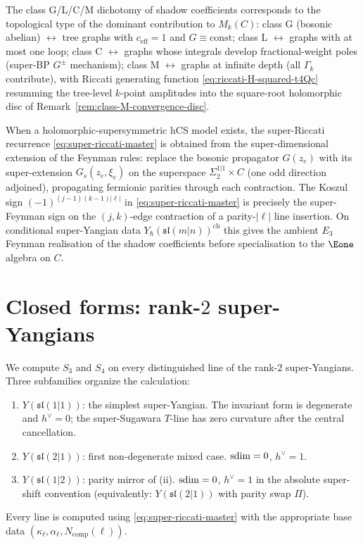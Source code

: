 \begin{remark}
\label{rem:shadow-class-geometric-Gamma-k}
The class G/L/C/M dichotomy of shadow coefficients corresponds to the
topological type of the dominant contribution to $M_k(C)$: class G
(bosonic abelian) $\leftrightarrow$ tree graphs with
$c_{\mathrm{eff}} = 1$ and $G \equiv \mathrm{const}$; class L
$\leftrightarrow$ graphs with at most one loop; class C
$\leftrightarrow$ graphs whose integrals develop fractional-weight
poles (super-BP $G^\pm$ mechanism); class M $\leftrightarrow$ graphs
at infinite depth (all $\Gamma_k$ contribute), with Riccati
generating function \eqref{eq:riccati-H-squared-t4Qc} resumming the
tree-level $k$-point amplitudes into the square-root holomorphic
disc of Remark~\ref{rem:class-M-convergence-disc}.
\end{remark}

\begin{remark}
\label{rem:super-feynman-fermionic-extension}
When a holomorphic-supersymmetric hCS model exists, the super-Riccati
recurrence \eqref{eq:super-riccati-master} is obtained from the
super-dimensional extension of the Feynman rules: replace the bosonic
propagator $G(z_e)$ with its super-extension $G_s(z_e,
\xi_e)$ on the superspace $\Sigma_2^{1|1} \times C$ (one odd
direction adjoined), propagating fermionic parities through each
contraction. The Koszul sign $(-1)^{(j-1)(k-1) |\ell|}$ in
\eqref{eq:super-riccati-master} is precisely the super-Feynman sign
on the $(j, k)$-edge contraction of a parity-$|\ell|$ line insertion.
On conditional super-Yangian data
$Y_\hbar(\mathfrak{sl}(m|n))^{\mathrm{ch}}$ this gives the ambient
$E_3$ Feynman realisation of the shadow coefficients before
specialisation to the $\Eone$ algebra on $C$.
\end{remark}

\section{Closed forms: rank-\texorpdfstring{$2$}{2} super-Yangians}
\label{sec:super-riccati-closed-forms}

We compute $S_3$ and $S_4$ on every distinguished line of the rank-$2$
super-Yangians. Three subfamilies organize the calculation:
\begin{enumerate}[label=\textup{(\roman*)},nosep]
\item $Y(\mathfrak{sl}(1|1))$: the simplest super-Yangian. The invariant
 form is degenerate and $h^\vee = 0$; the super-Sugawara $T$-line has
 zero curvature after the central cancellation.
\item $Y(\mathfrak{sl}(2|1))$: first non-degenerate mixed case.
 $\mathrm{sdim} = 0$, $h^\vee = 1$.
\item $Y(\mathfrak{sl}(1|2))$: parity mirror of (ii). $\mathrm{sdim} = 0$,
 $h^\vee = 1$ in the absolute super-shift convention (equivalently:
 $Y(\mathfrak{sl}(2|1))$ with parity
swap $\Pi$).
\end{enumerate}
Every line is computed using \eqref{eq:super-riccati-master} with the
appropriate base data $(\kappa_\ell, \alpha_\ell, N_{\mathrm{comp}}(\ell))$.

